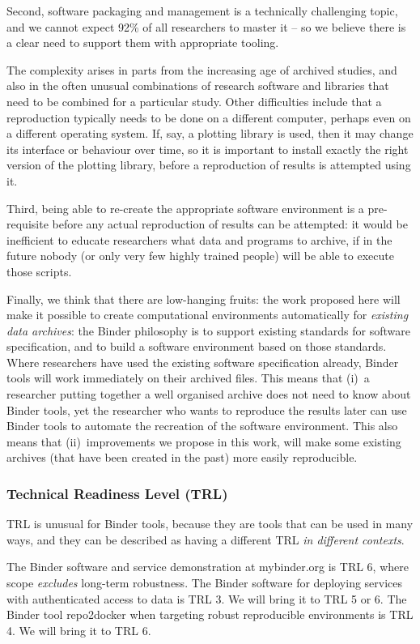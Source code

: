 Second, software packaging and management is a technically challenging topic,
and we cannot expect 92\% of all researchers to master it -- so we believe there
is a clear need to support them with appropriate tooling.

The complexity arises in parts from the increasing age of archived studies, and
also in the often unusual combinations of research software and libraries that
need to be combined for a particular study. Other difficulties include that a
reproduction typically needs to be done on a different computer, perhaps even on
a different operating system. If, say, a plotting library is used, then it may
change its interface or behaviour over time, so it is important to install
exactly the right version of the plotting library, before a reproduction of
results is attempted using it.

Third, being able to re-create the appropriate software environment is a
pre-requisite before any actual reproduction of results can be attempted: it
would be inefficient to educate researchers what data and programs to archive,
if in the future nobody (or only very few highly trained people) will be able to
execute those scripts.

Finally, we think that there are low-hanging fruits: the work proposed here will
make it possible to create computational environments automatically for
\emph{existing data archives}: the Binder philosophy is to support existing standards for software
specification, and to build a software environment based on those standards.
Where researchers have used the existing software specification already, Binder tools
will work immediately on their archived files. This means that (i)~a researcher
putting together a well organised archive does not need to know about Binder tools,
yet the researcher who wants to reproduce the results later can use Binder tools to
automate the recreation of the software environment. This also means that
(ii)~improvements we propose in this work, will make some existing archives (that
have been created in the past) more easily reproducible.







\subsubsection{Technical Readiness Level (TRL)}

TRL is unusual for Binder tools, because they are tools that can be used in many ways,
and they can be described as having a different TRL \emph{in different contexts}.

The Binder software and service demonstration at mybinder.org is TRL 6,
where scope \emph{excludes} long-term robustness.
The Binder software for deploying services with authenticated access to data is TRL 3.
We will bring it to TRL 5 or 6.
The Binder tool repo2docker when targeting robust reproducible environments is TRL 4.
We will bring it to TRL 6.

